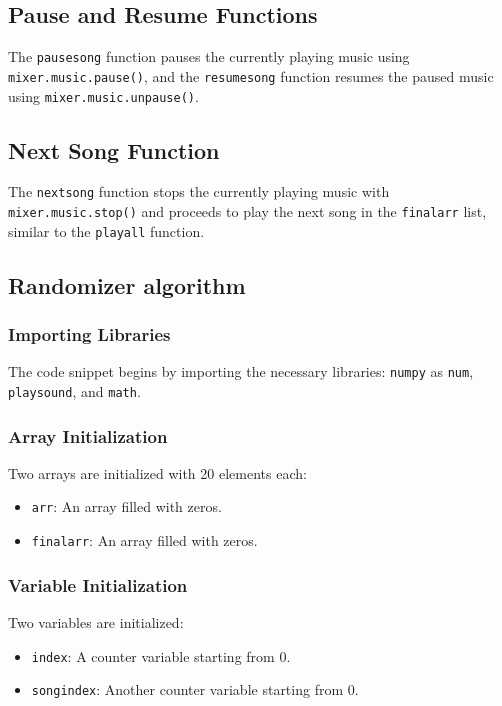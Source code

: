 \documentclass[journal,12pt,twocolumn]{IEEEtran}
\begin{document}
\subsection{Pause and Resume Functions}
The \texttt{pausesong} function pauses the currently playing music using \texttt{mixer.music.pause()}, and the \texttt{resumesong} function resumes the paused music using \texttt{mixer.music.unpause()}.

\subsection{Next Song Function}
The \texttt{nextsong} function stops the currently playing music with \texttt{mixer.music.stop()} and proceeds to play the next song in the \texttt{finalarr} list, similar to the \texttt{playall} function.

\subsection{Randomizer algorithm}

\subsubsection{Importing Libraries}
The code snippet begins by importing the necessary libraries: \texttt{numpy} as \texttt{num}, \texttt{playsound}, and \texttt{math}.

\subsubsection{Array Initialization}
Two arrays are initialized with 20 elements each:
\begin{itemize}
  \item \texttt{arr}: An array filled with zeros.
  \item \texttt{finalarr}: An array filled with zeros.
\end{itemize}

\subsubsection{Variable Initialization}
Two variables are initialized:
\begin{itemize}
  \item \texttt{index}: A counter variable starting from 0.
  \item \texttt{songindex}: Another counter variable starting from 0.
\end{itemize}
\end{document}
